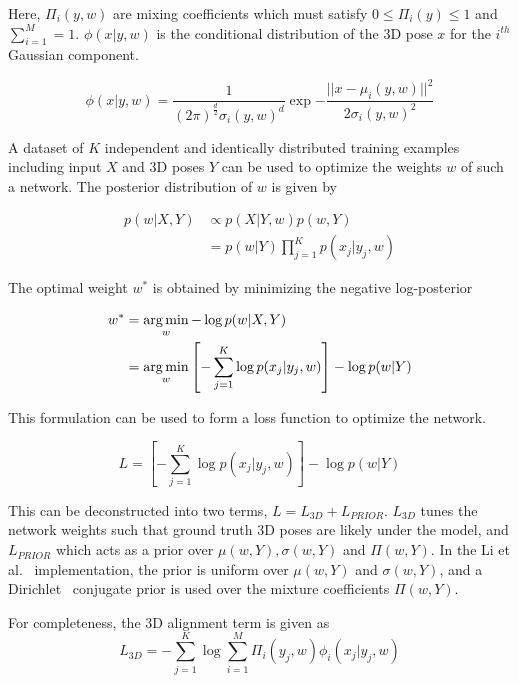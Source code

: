 Here, $\Pi_{i}(y, w)$ are mixing coefficients which must satisfy $0 \leq \Pi_{i}(y) \leq 1$ and $\sum_{i=1}^{M} = 1$. $\phi(x | y, w)$ is the conditional distribution of the 3D pose $x$ for the $i^{th}$ Gaussian component. 

\begin{equation}
  \phi(x | y, w) = 
    \frac{
      1
    }{
      (2\pi)^{\frac{d}{2}} \sigma_{i}(y, w)^{d}
    } 
    \exp{
    -\frac{
      || x - \mu_{i}(y, w) ||^{2}
    }{
      2\sigma_{i}(y, w)^{2}
    }
  }
\end{equation}

A dataset of $K$ independent and identically distributed training examples including input $X$ and 3D poses $Y$ can be used to optimize the weights $w$ of such a network. The posterior distribution of $w$ is given by

\begin{align}
  p(w | X, Y) 
  &\propto p(X | Y, w)p(w, Y) \\
  &= p(w | Y) \prod_{j=1}^{K} p(x_j | y_j, w)
\end{align}

The optimal weight $w^{*}$ is obtained by minimizing the negative log-posterior

\begin{align}
  w^{*} &= \operatorname*{arg\,min}_{w} -\log p(w | X, Y) \\
        &= \operatorname*{arg\,min}_{w} \left[-\sum_{j=1}^{K} \log p(x_j | y_j, w)\right] - \log p(w | Y)
\end{align}

This formulation can be used to form a loss function to optimize the network. 

\begin{equation}
  L = \left[-\sum_{j=1}^{K} \log p(x_j | y_j, w)\right] - \log p(w | Y)
\end{equation}

This can be deconstructed into two terms, $L = L_{3D} + L_{PRIOR}$. $L_{3D}$ tunes the network weights such that ground truth 3D poses are likely under the model, and $L_{PRIOR}$ which acts as a prior over $\mu(w, Y), \sigma(w, Y)$ and $\Pi(w, Y)$. In the Li et al.~\cite{xxx} implementation, the prior is uniform over $\mu(w, Y)$ and $\sigma(w, Y)$, and a Dirichlet~\cite{xxx} conjugate prior is used over the mixture coefficients $\Pi(w, Y)$. 

For completeness, the 3D alignment term is given as
\begin{equation}
  L_{3D} = -\sum_{j=1}^{K} \log \sum_{i=1}^{M} \Pi_{i}(y_{j}, w) \phi_{i}(x_j | y_j, w)
\end{equation}

